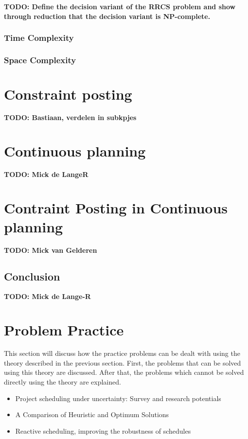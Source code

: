 \documentclass{article}
\newcommand{\TODO}[1]{{\color{red}\textbf{TODO: #1}}}
\begin{document}
\TODO{Define the decision variant of the RRCS problem and show through reduction that the decision variant is NP-complete.}
\subsubsection{Time Complexity}
\subsubsection{Space Complexity}

\section{Constraint posting}
\TODO{Bastiaan, verdelen in subkpjes}

\section{Continuous planning}
\TODO{Mick de LangeR}

\section{Contraint Posting in Continuous planning}
\TODO{Mick van Gelderen}

\subsection{Conclusion}
\TODO{Mick de Lange-R}

\section{Problem Practice}
This section will discuss how the practice problems can be dealt with using the theory described in the previous section. First, the problems that can be solved using this theory are discussed. After that, the problems which cannot be solved directly using the theory are explained.\\

\begin{itemize}
\item Project scheduling under uncertainty: Survey
and research potentials
\item A Comparison of Heuristic and Optimum Solutions
\item Reactive scheduling, improving the robustness of schedules
\end{itemize}
\end{document}
